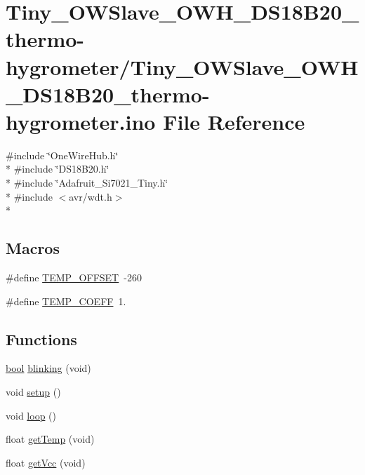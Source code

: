 \hypertarget{Tiny__OWSlave__OWH__DS18B20__thermo-hygrometer_8ino}{\section{Tiny\-\_\-\-O\-W\-Slave\-\_\-\-O\-W\-H\-\_\-\-D\-S18\-B20\-\_\-thermo-\/hygrometer/\-Tiny\-\_\-\-O\-W\-Slave\-\_\-\-O\-W\-H\-\_\-\-D\-S18\-B20\-\_\-thermo-\/hygrometer.ino File Reference}
\label{Tiny__OWSlave__OWH__DS18B20__thermo-hygrometer_8ino}
}
{\ttfamily \#include \char`\"{}One\-Wire\-Hub.\-h\char`\"{}}\\*
{\ttfamily \#include \char`\"{}D\-S18\-B20.\-h\char`\"{}}\\*
{\ttfamily \#include \char`\"{}Adafruit\-\_\-\-Si7021\-\_\-\-Tiny.\-h\char`\"{}}\\*
{\ttfamily \#include $<$avr/wdt.\-h$>$}\\*
\subsection*{Macros}
\begin{DoxyCompactItemize}
\item 
\#define \hyperlink{Tiny__OWSlave__OWH__DS18B20__thermo-hygrometer_8ino_a3cb24f09004f92185b77e9e7bac6ea61}{T\-E\-M\-P\-\_\-\-O\-F\-F\-S\-E\-T}~-\/260
\item 
\#define \hyperlink{Tiny__OWSlave__OWH__DS18B20__thermo-hygrometer_8ino_ab667d793bed5c1fb5503624b0ab7504a}{T\-E\-M\-P\-\_\-\-C\-O\-E\-F\-F}~1.
\end{DoxyCompactItemize}
\subsection*{Functions}
\begin{DoxyCompactItemize}
\item 
\hyperlink{stdbool_8h_abb452686968e48b67397da5f97445f5b}{bool} \hyperlink{Tiny__OWSlave__OWH__DS18B20__thermo-hygrometer_8ino_a6766eee584b84ead350781efbabe36d7}{blinking} (void)
\item 
void \hyperlink{Tiny__OWSlave__OWH__DS18B20__thermo-hygrometer_8ino_a4fc01d736fe50cf5b977f755b675f11d}{setup} ()
\item 
void \hyperlink{Tiny__OWSlave__OWH__DS18B20__thermo-hygrometer_8ino_afe461d27b9c48d5921c00d521181f12f}{loop} ()
\item 
float \hyperlink{Tiny__OWSlave__OWH__DS18B20__thermo-hygrometer_8ino_af457592e93b296e5ea12f1cc16ec7795}{get\-Temp} (void)
\item 
float \hyperlink{Tiny__OWSlave__OWH__DS18B20__thermo-hygrometer_8ino_acd16ee68f07b74cf5f62870589bf3d70}{get\-Vcc} (void)
\end{DoxyCompactItemize}
